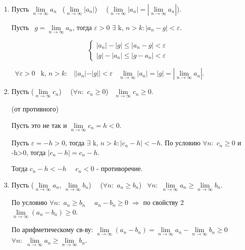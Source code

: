 \documentclass{article}
\begin{document}

\begin{enumerate}

\item Пусть \exists $\lim\limits_{n\to\infty}{a_n}$ \implies \ (\exists $\lim\limits_{n\to\infty}{|a_n|}$) \ \bigwedge \ ($\lim\limits_{n\to\infty}{|a_n|}=|\lim\limits_{n\to\infty}{a_n}|$).

\proof

Пусть \exists \ $g=\lim\limits_{n\to\infty}{a_n}$, тогда \forall $\varepsilon>0$ $\exists$ k, \forall $n>k: |a_n-g|<\varepsilon$.

\begin{equation*}
\begin{cases}
|a_n|-|g|\leq|a_n-g|<\varepsilon 
\\                    
|g|-|a_n|\leq |g-a_n|<\varepsilon
\end{cases}
\end{equation*}

\implies \ $\forall \varepsilon>0$ \exists \ k, \forall $n>k:$ \ $||a_n|-|g||<\varepsilon$ \Rightarrow \ $\lim\limits_{n\to\infty}{|a_n|}=|g|=|\lim\limits_{n\to\infty}{a_n}|$.

\item Пусть (\exists $\lim\limits_{n\to\infty}{c_n}$) \ \bigwedge \ ($\forall n:$ $c_n\geq 0$) \implies \  $\lim\limits_{n\to\infty}{c_n}\geq 0$.

\proof (от противного)

Пусть это не так и $\lim\limits_{n\to\infty}{c_n}=h<0$.

Пусть $\varepsilon=-h>0$, тогда $\exists$ k, \forall $n>k: |c_n-h|<-h$. По условию $\forall n:$ $c_n\geq 0$ и -h>0, тогда $|c_n-h|=c_n-h$.

Тогда $c_n-h<-h$ \ \Leftrightarrow \ $c_n<0$ - противоречие.

\item Пусть (\exists $\lim\limits_{n\to\infty}{a_n}$, \exists $\lim\limits_{n\to\infty}{b_n}$) \ \bigwedge \ ($\forall n:$ $a_n\geq b_n$) \implies \ $\forall n:$ $\lim\limits_{n\to\infty}{a_n}\geq \lim\limits_{n\to\infty}{b_n}$.

\proof

По условию $\forall n:$ $a_n\geq b_n$ \ \Leftrightarrow \ $a_n-b_n\geq 0$ $\Rightarrow$  по свойству 2 $\lim\limits_{n\to\infty}{(a_n-b_n)}\geq 0$.

По арифметическому св-ву: $\lim\limits_{n\to\infty}{(a_n-b_n)}=\lim\limits_{n\to\infty}{a_n}-\lim\limits_{n\to\infty}{b_n}\geq 0$ \ \implies \ $\forall n:$ $\lim\limits_{n\to\infty}{a_n}\geq \lim\limits_{n\to\infty}{b_n}$.


\end{enumerate}
\end{document}
